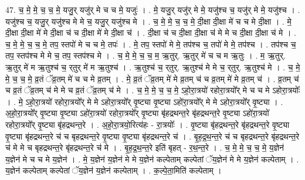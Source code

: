 \documentclass[17pt]{extarticle}
\begin{document}
47. च॒ मे॒ मे॒ च॒ च॒ मे॒ यजु॒र् यजु॑र् मे च च मे॒ यजुः॑ । . मे॒ यजु॒र् यजु॑र् मे मे॒ यजु॑श्च च॒ यजु॑र् मे मे॒ यजु॑श्च । . यजु॑श्च च॒ यजु॒र् यजु॑श्च मे मे च॒ यजु॒र् यजु॑श्च मे । . च॒ मे॒ मे॒ च॒ च॒ मे॒ दी॒क्षा दी॒क्षा मे॑ च च मे दी॒क्षा । . मे॒ दी॒क्षा दी॒क्षा मे॑ मे दी॒क्षा च॑ च दी॒क्षा मे॑ मे दी॒क्षा च॑ । . दी॒क्षा च॑ च दी॒क्षा दी॒क्षा च॑ मे मे च दी॒क्षा दी॒क्षा च॑ मे । . च॒ मे॒ मे॒ च॒ च॒ मे॒ तप॒ स्तपो॑ मे च च मे॒ तपः॑ । . मे॒ तप॒ स्तपो॑ मे मे॒ तप॑श्च च॒ तपो॑ मे मे॒ तप॑श्च । . तप॑श्च च॒ तप॒ स्तप॑श्च मे मे च॒ तप॒ स्तप॑श्च मे । . च॒ मे॒ मे॒ च॒ च॒ म॒ ऋ॒तुर्. ऋ॒तुर् मे॑ च च म ऋ॒तुः । . म॒ ऋ॒तुर्. ऋ॒तुर् मे॑ म ऋ॒तुश्च॑ च॒ र्‌तुर् मे॑ म ऋ॒तुश्च॑ । . ऋ॒तुश्च॑ च॒ र्‌तुर्. ऋ॒तुश्च॑ मे मे च॒ र्‌तुर्. ऋ॒तुश्च॑ मे । . च॒ मे॒ मे॒ च॒ च॒ मे॒ व्र॒तं ॅव्र॒तम् मे॑ च च मे व्र॒तम् । . मे॒ व्र॒तं ॅव्र॒तम् मे॑ मे व्र॒तम् च॑ च व्र॒तम् मे॑ मे व्र॒तम् च॑ । . व्र॒तम् च॑ च व्र॒तं ॅव्र॒तम् च॑ मे मे च व्र॒तं ॅव्र॒तम् च॑ मे । . च॒ मे॒ मे॒ च॒ च॒ मे॒ ऽहो॒रा॒त्रयो॑ रहोरा॒त्रयो᳚र् मे च च मे ऽहोरा॒त्रयोः᳚ । . मे॒ ऽहो॒रा॒त्रयो॑ रहोरा॒त्रयो᳚र् मे मे ऽहोरा॒त्रयो᳚र् वृ॒ष्ट्या वृ॒ष्ट्या ऽहो॑रा॒त्रयो᳚र् मे मे ऽहोरा॒त्रयो᳚र् वृ॒ष्ट्या । . अ॒हो॒रा॒त्रयो᳚र् वृ॒ष्ट्या वृ॒ष्ट्या ऽहो॑रा॒त्रयो॑ रहोरा॒त्रयो᳚र् वृ॒ष्ट्या बृ॑हद्रथन्त॒रे बृ॑हद्रथन्त॒रे वृ॒ष्ट्या ऽहो॑रा॒त्रयो॑ रहोरा॒त्रयो᳚र् वृ॒ष्ट्या बृ॑हद्रथन्त॒रे । . अ॒हो॒रा॒त्रयो॒रित्य॑हः - रा॒त्रयोः᳚ । . वृ॒ष्ट्या बृ॑हद्रथन्त॒रे बृ॑हद्रथन्त॒रे वृ॒ष्ट्या वृ॒ष्ट्या बृ॑हद्रथन्त॒रे च॑ च बृहद्रथन्त॒रे वृ॒ष्ट्या वृ॒ष्ट्या बृ॑हद्रथन्त॒रे च॑ । . बृ॒ह॒द्र॒थ॒न्त॒रे च॑ च बृहद्रथन्त॒रे बृ॑हद्रथन्त॒रे च॑ मे मे च बृहद्रथन्त॒रे बृ॑हद्रथन्त॒रे च॑ मे । . बृ॒ह॒द्र॒थ॒न्त॒रे इति॑ बृहत् - र॒थ॒न्त॒रे । . च॒ मे॒ मे॒ च॒ च॒ मे॒ य॒ज्ञेन॑ य॒ज्ञेन॑ मे च च मे य॒ज्ञेन॑ । . मे॒ य॒ज्ञेन॑ य॒ज्ञेन॑ मे मे य॒ज्ञेन॑ कल्पेताम् कल्पेतां ॅय॒ज्ञेन॑ मे मे य॒ज्ञेन॑ कल्पेताम् । . य॒ज्ञेन॑ कल्पेताम् कल्पेतां ॅय॒ज्ञेन॑ य॒ज्ञेन॑ कल्पेताम् । . क॒ल्पे॒ता॒मिति॑ कल्पेताम् । \newline
\pagebreak
{}
\end{document}
